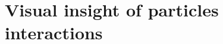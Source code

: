\documentclass{sintefbeamer}
\newcommand{\pavg}[1]{n \left<#1\right>}
\newcommand{\pnavg}[1]{\left<#1\right>}
\newcommand{\nstavg}[1]{\overline{#1}_{nst}}
\newcommand{\nstrelavg}[1]{\overline{#1}_{nst}^{rel}}
\begin{document}

  



\section{Visual insight of particles interactions}
\end{document}
